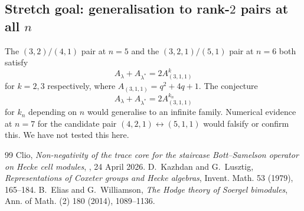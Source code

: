 \documentclass[11pt]{article}
\theoremstyle{plain}
\theoremstyle{definition}
\theoremstyle{remark}
\begin{document}
\subsection{Stretch goal: generalisation to rank-$2$ pairs at all $n$}

The $(3,2)/(4,1)$ pair at $n=5$ and the $(3,2,1)/(5,1)$ pair at $n=6$ both
satisfy
\[
A_\lambda + A_{\lambda^*} = 2 A_{(3,1,1)}^k
\]
for $k = 2, 3$ respectively, where $A_{(3,1,1)} = q^2 + 4q + 1$.  The
conjecture
\[
A_\lambda + A_{\lambda^*} = 2 A_{(3,1,1)}^{k_n}
\]
for $k_n$ depending on $n$ would generalise to an infinite family.  Numerical
evidence at $n = 7$ for the candidate pair $(4,2,1) \leftrightarrow (5,1,1)$ would
falsify or confirm this.  We have not tested this here.

\begin{thebibliography}{99}
Clio, \emph{Non-negativity of the trace core for the staircase Bott--Samelson
operator on Hecke cell modules},
,
24 April 2026.
D.~Kazhdan and G.~Lusztig, \emph{Representations of Coxeter groups and Hecke
algebras}, Invent. Math. 53 (1979), 165--184.
B.~Elias and G.~Williamson, \emph{The Hodge theory of Soergel bimodules}, Ann.
of Math. (2) 180 (2014), 1089--1136.
\end{thebibliography}
\end{document}
